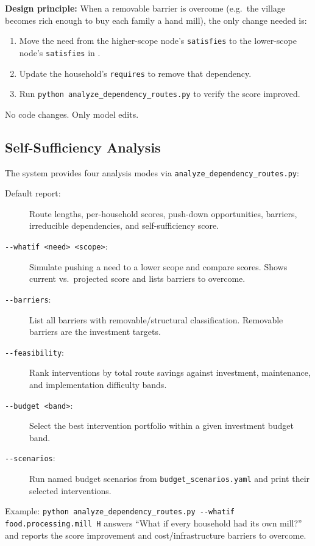 \documentclass[11pt,a4paper]{article}
\begin{document}
\textbf{Design principle:} When a removable barrier is overcome (e.g.\ the village becomes rich enough to buy each family a hand mill), the only change needed is:
\begin{enumerate}
    \item Move the need from the higher-scope node's \texttt{satisfies} to the lower-scope node's \texttt{satisfies} in .
    \item Update the household's \texttt{requires} to remove that dependency.
    \item Run \texttt{python analyze\_dependency\_routes.py} to verify the score improved.
\end{enumerate}

No code changes. Only model edits.

\subsection{Self-Sufficiency Analysis}

The system provides four analysis modes via \texttt{analyze\_dependency\_routes.py}:

\begin{description}
    \item[Default report:] Route lengths, per-household scores, push-down opportunities, barriers, irreducible dependencies, and self-sufficiency score.
    \item[\texttt{-{}-whatif <need> <scope>}:] Simulate pushing a need to a lower scope and compare scores. Shows current vs.\ projected score and lists barriers to overcome.
    \item[\texttt{-{}-barriers}:] List all barriers with removable/structural classification. Removable barriers are the investment targets.
    \item[\texttt{-{}-feasibility}:] Rank interventions by total route savings against investment, maintenance, and implementation difficulty bands.
    \item[\texttt{-{}-budget <band>}:] Select the best intervention portfolio within a given investment budget band.
    \item[\texttt{-{}-scenarios}:] Run named budget scenarios from \texttt{budget\_scenarios.yaml} and print their selected interventions.
\end{description}

Example: \texttt{python analyze\_dependency\_routes.py -{}-whatif food.processing.mill H} answers ``What if every household had its own mill?'' 
and reports the score improvement and cost/infrastructure barriers to overcome.
\end{document}
